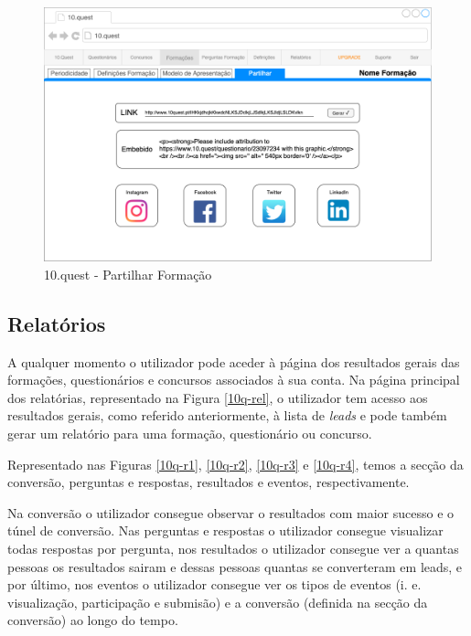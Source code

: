 \begin{figure}[ht!]
	\begin{center}
		\includegraphics[width=1\textwidth]{img/prototipos/12.png}
		\caption{10.quest - Partilhar Formação}
		\label{10q-}
	\end{center}
\end{figure}


\newpage

\subsection{Relatórios}

A qualquer momento o utilizador pode aceder à página dos resultados gerais das formações, questionários e concursos associados à sua conta. Na página principal dos relatórias, representado na Figura \ref{10q-rel}, o utilizador tem acesso aos resultados gerais, como referido anteriormente, à lista de \textit{leads} e pode também gerar um relatório para uma formação, questionário ou concurso.

Representado nas Figuras \ref{10q-r1}, \ref{10q-r2}, \ref{10q-r3} e \ref{10q-r4}, temos a secção da conversão, perguntas e respostas, resultados e eventos, respectivamente. 

Na conversão o utilizador consegue observar o resultados com maior sucesso e o túnel de conversão. Nas perguntas e respostas o utilizador consegue visualizar todas respostas por pergunta, nos resultados o utilizador consegue ver a quantas pessoas os resultados sairam e dessas pessoas quantas se converteram em leads, e por último, nos eventos o utilizador consegue ver os tipos de eventos (i. e. visualização, participação e submisão) e a conversão (definida na secção da conversão) ao longo do tempo.

